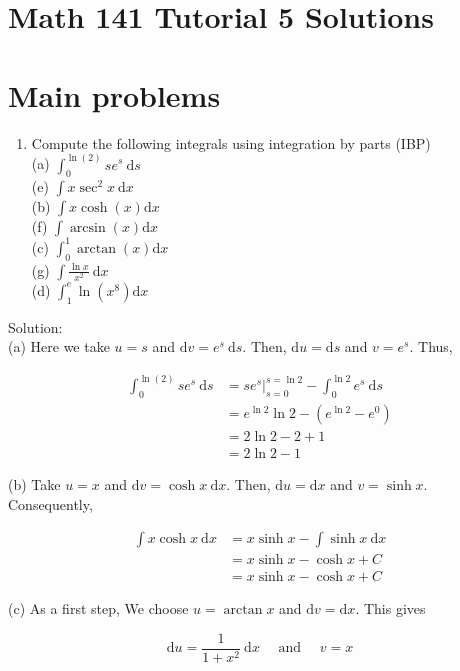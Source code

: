 \documentclass[10pt]{article}
\begin{document}
\section*{Math 141 Tutorial 5 Solutions}
\section*{Main problems}
\begin{enumerate}
  \item Compute the following integrals using integration by parts (IBP)\\
(a) $\int_{0}^{\ln (2)} s e^{s} \mathrm{~d} s$\\
(e) $\int x \sec ^{2} x \mathrm{~d} x$\\
(b) $\int x \cosh (x) \mathrm{d} x$\\
(f) $\int \arcsin (x) \mathrm{d} x$\\
(c) $\int_{0}^{1} \arctan (x) \mathrm{d} x$\\
(g) $\int \frac{\ln x}{x^{2}} \mathrm{~d} x$\\
(d) $\int_{1}^{e} \ln \left(x^{8}\right) \mathrm{d} x$
\end{enumerate}

Solution:\\
(a) Here we take $u=s$ and $\mathrm{d} v=e^{s} \mathrm{~d} s$. Then, $\mathrm{d} u=\mathrm{d} s$ and $v=e^{s}$. Thus,

$$
\begin{aligned}
\int_{0}^{\ln (2)} s e^{s} \mathrm{~d} s & =\left.s e^{s}\right|_{s=0} ^{s=\ln 2}-\int_{0}^{\ln 2} e^{s} \mathrm{~d} s \\
& =e^{\ln 2} \ln 2-\left(e^{\ln 2}-e^{0}\right) \\
& =2 \ln 2-2+1 \\
& =2 \ln 2-1
\end{aligned}
$$

(b) Take $u=x$ and $\mathrm{d} v=\cosh x \mathrm{~d} x$. Then, $\mathrm{d} u=\mathrm{d} x$ and $v=\sinh x$. Consequently,

$$
\begin{aligned}
\int x \cosh x \mathrm{~d} x & =x \sinh x-\int \sinh x \mathrm{~d} x \\
& =x \sinh x-\cosh x+C \\
& =x \sinh x-\cosh x+C
\end{aligned}
$$

(c) As a first step, We choose $u=\arctan x$ and $\mathrm{d} v=\mathrm{d} x$. This gives

$$
\mathrm{d} u=\frac{1}{1+x^{2}} \mathrm{~d} x \quad \text { and } \quad v=x
$$
\end{document}
